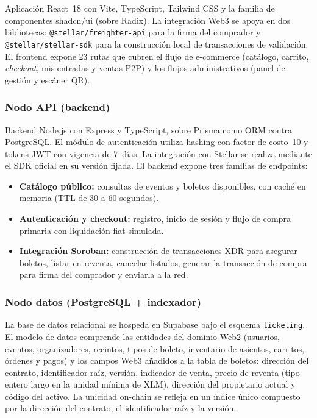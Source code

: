 Aplicación React~18 con Vite, TypeScript, Tailwind CSS y la familia de componentes shadcn/ui (sobre Radix).
La integración Web3 se apoya en dos bibliotecas: \texttt{@stellar/freighter-api} para la firma del comprador
y \texttt{@stellar/stellar-sdk} para la construcción local de transacciones de validación. El frontend expone
23 rutas que cubren el flujo de e-commerce (catálogo, carrito, \textit{checkout}, mis entradas y ventas P2P)
y los flujos administrativos (panel de gestión y escáner QR).

\subsubsection{Nodo API (backend)}

Backend Node.js con Express y TypeScript, sobre Prisma como ORM contra PostgreSQL. El módulo de autenticación
utiliza hashing con factor de costo~10 y tokens JWT con vigencia de 7~días. La integración con Stellar se
realiza mediante el SDK oficial en su versión fijada. El backend expone tres familias de endpoints:

\begin{itemize}\setlength{\itemsep}{2pt}
    \item \textbf{Catálogo público:} consultas de eventos y boletos disponibles, con caché en memoria (TTL de
30 a 60 segundos).
    \item \textbf{Autenticación y checkout:} registro, inicio de sesión y flujo de compra primaria con
liquidación fiat simulada.
    \item \textbf{Integración Soroban:} construcción de transacciones XDR para asegurar boletos, listar en
reventa, cancelar listados, generar la transacción de compra para firma del comprador y enviarla a la red.
\end{itemize}

\subsubsection{Nodo datos (PostgreSQL + indexador)}

La base de datos relacional se hospeda en Supabase bajo el esquema \texttt{ticketing}. El modelo de datos
comprende las entidades del dominio Web2 (usuarios, eventos, organizadores, recintos, tipos de boleto,
inventario de asientos, carritos, órdenes y pagos) y los campos Web3 añadidos a la tabla de boletos:
dirección del contrato, identificador raíz, versión, indicador de venta, precio de reventa (tipo entero largo
en la unidad mínima de XLM), dirección del propietario actual y código del activo. La unicidad on-chain se
refleja en un índice único compuesto por la dirección del contrato, el identificador raíz y la versión.

